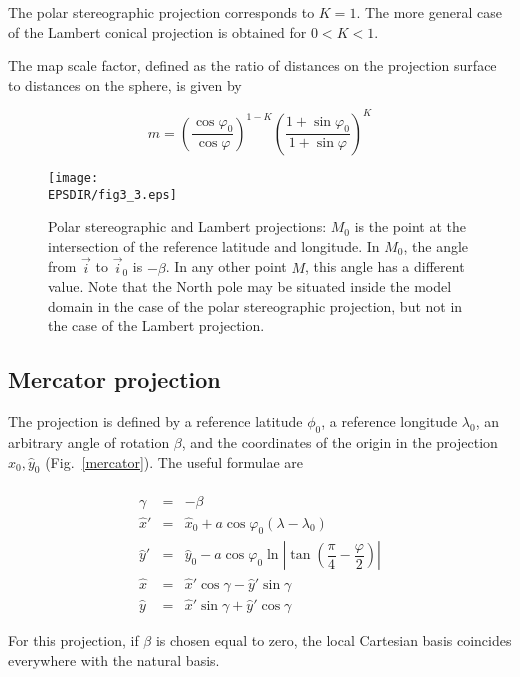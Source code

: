The polar stereographic projection corresponds to $K=1$. The more general case
of the Lambert conical projection is obtained for $0<K<1$.

The map scale factor, defined as the ratio of distances on the projection
surface to distances on the sphere, is given by

\begin{equation}
m=\left( \dfrac{\cos \varphi _{0}}{\cos \varphi}\right)^{1-K}
\left( \dfrac{1 + \sin\varphi _{0}}{1 + \sin\varphi} \right)^{K}
\end{equation}

\begin{figure}[!ht]
\centerline{\texttt{[image: \\EPSDIR/fig3\_3.eps]}}
\caption{Polar stereographic and Lambert projections: $M_0$ is the point
at the intersection of the reference latitude and longitude. In $M_0$, the
angle from $\vec{i}$ to $\vec{i}_0$ is $-\beta$. In any other point $M$,
this angle has a different value. Note that the North pole may be situated
inside the model domain in the case of the polar stereographic projection,
but not in the case of the Lambert projection.}
\label{polarstereo}
\end{figure}

\subsection{Mercator projection}

The projection is defined by a reference latitude $\phi_0$, a reference
longitude $\lambda_0$, an arbitrary angle of rotation $\beta$,
and the coordinates of the origin in the projection
$\widehat{x}_0, \widehat{y}_0$ (Fig.~\ref{mercator}). The useful formulae are

\begin{eqnarray}
\nonumber \\ \gamma & = & - \beta \nonumber \\
\widehat{x}' & = & \widehat{x}_0
+ a \cos \varphi _{0}(\lambda - \lambda _{0})  \nonumber \\
\widehat{y}' & = & \widehat{y}_0
 -a\cos\varphi _{0} \ln|\tan(\dfrac{\pi}{4}-\dfrac{\varphi}{2})|  \\
\widehat{x}  & = & \widehat{x}'\cos\gamma - \widehat{y}'\sin\gamma
\nonumber \\
\widehat{y}  & = & \widehat{x}'\sin\gamma + \widehat{y}'\cos\gamma
\nonumber
\end{eqnarray}

For this projection, if $\beta$ is chosen equal to zero, the local
Cartesian basis coincides everywhere with the natural basis.

